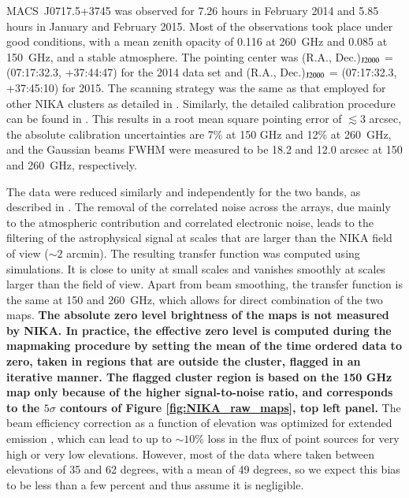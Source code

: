 \documentclass[twocolumn,traditabstract]{aa}
\begin{document}
\mbox{MACS~J0717.5+3745} was observed for 7.26 hours in February 2014 and 5.85 hours in January and February 2015. Most of the observations took place under good conditions, with a mean zenith opacity of 0.116 at 260~GHz and 0.085 at 150~GHz, and a stable atmosphere. The pointing center was (R.A., Dec.)$_{\rm J2000}$ = (07:17:32.3, +37:44:47) for the 2014 data set and (R.A., Dec.)$_{\rm J2000}$ = (07:17:32.3, +37:45:10) for 2015. The scanning strategy was the same as that employed for other NIKA clusters as detailed in \cite{Adam2015,Adam2016}. Similarly, the detailed calibration procedure can be found in \cite{Adam2014,Adam2015}. This results in a root mean square pointing error of $\lesssim 3$ arcsec, the absolute calibration uncertainties are 7\% at 150 GHz and 12\% at 260~GHz, and the Gaussian beams FWHM were measured to be 18.2 and 12.0 arcsec at 150 and 260~GHz, respectively.

The data were reduced similarly and independently for the two bands, as described in \cite{Adam2015}. The removal of the correlated noise across the arrays, due mainly to the atmospheric contribution and correlated electronic noise, leads to the filtering of the astrophysical signal at scales that are larger than the NIKA field of view ($\sim 2$ arcmin). The resulting transfer function was computed using simulations. It is close to unity at small scales and vanishes smoothly at scales larger than the field of view. Apart from beam smoothing, the transfer function is the same at 150 and 260~GHz, which allows for direct combination of the two maps. {\bf The absolute zero level brightness of the maps is not measured by NIKA. In practice, the effective zero level is computed during the mapmaking procedure by setting the mean of the time ordered data to zero, taken in regions that are outside the cluster, flagged in an iterative manner. The flagged cluster region is based on the 150 GHz map only because of the higher signal-to-noise ratio, and corresponds to the $5 \sigma$ contours of Figure \ref{fig:NIKA_raw_maps}, top left panel.} The beam efficiency correction as a function of elevation was optimized for extended emission \citep{Greve1998}, which can lead to up to $\sim 10$\% loss in the flux of point sources for very high or very low elevations. However, most of the data where taken between elevations of 35 and 62 degrees, with a mean of 49 degrees, so we expect this bias to be less than a few percent and thus assume it is negligible.
\end{document}
